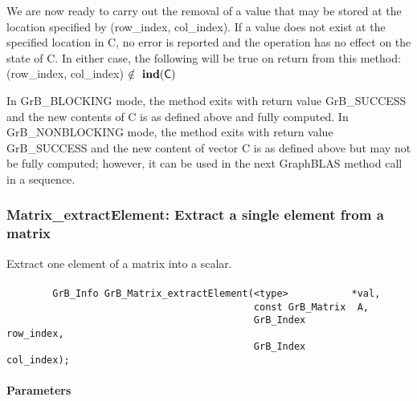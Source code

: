 We are now ready to carry out the removal of a value that may be stored at the
location specified by ({\sf row\_index}, {\sf col\_index}).  If a value does not
exist at the specified location in {\sf C}, no error is reported and the 
operation has no effect on the state of {\sf C}.  In either case, the following 
will be true on return from this method: 
({\sf row\_index}, {\sf col\_index}) $\notin~\mathbf{ind}({\sf C})$

In {\sf GrB\_BLOCKING} mode, the method exits with return value 
{\sf GrB\_SUCCESS} and the new contents of {\sf C} is as defined above
and fully computed.  
In {\sf GrB\_NONBLOCKING} mode, the method exits with return value 
{\sf GrB\_SUCCESS} and the new content of vector {\sf C} is as defined above 
but may not be fully computed; however, it can be used in the next GraphBLAS 
method call in a sequence.



\subsubsection{{\sf Matrix\_extractElement}: Extract a single element from a matrix}
\label{Sec:Matrix_extractElement}


Extract one element of a matrix into a scalar. 

\paragraph{\syntax}

\begin{verbatim}
        GrB_Info GrB_Matrix_extractElement(<type>           *val,
                                           const GrB_Matrix  A,
                                           GrB_Index         row_index,
                                           GrB_Index         col_index); 

\end{verbatim}

\paragraph{Parameters}

